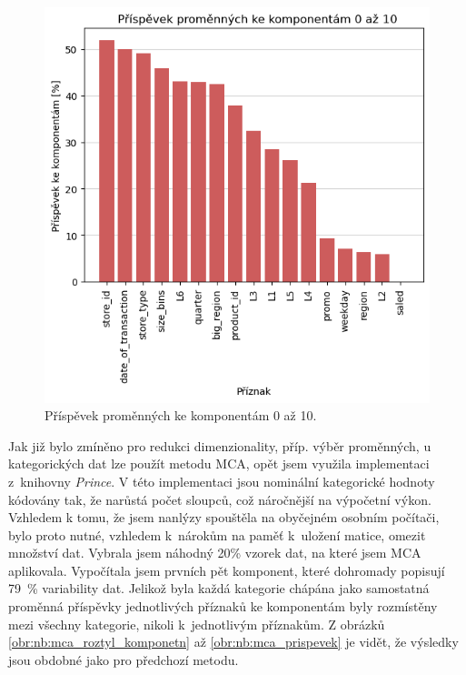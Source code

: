 \begin{figure}[h!]
    \centering
    \includegraphics[width=.6\textwidth]{obrazky/pripravadat/pca-prispevky.png}
    \caption{Příspěvek proměnných ke komponentám 0 až 10.}
    \label{obr:nb:pca_prispevek}
\end{figure}
    
Jak již bylo zmíněno pro redukci dimenzionality, příp. výběr proměnných, u kategorických dat lze použít metodu MCA, opět jsem využila implementaci z~knihovny \emph{Prince}. 
V této implementaci jsou nominální kategorické hodnoty kódovány tak, že narůstá počet sloupců, což náročnější na výpočetní výkon. Vzhledem k tomu, že jsem nanlýzy spouštěla na obyčejném osobním počítači, bylo proto nutné, vzhledem k~nárokům na paměť k~uložení matice, omezit množství dat. 
Vybrala jsem náhodný 20\% vzorek dat, na které jsem MCA aplikovala. Vypočítala jsem prvních pět komponent, které dohromady popisují 79~\% variability dat. Jelikož byla každá kategorie chápána jako samostatná proměnná příspěvky jednotlivých příznaků ke komponentám byly rozmístěny mezi všechny kategorie, nikoli k~jednotlivým příznakům. 
Z obrázků \ref*{obr:nb:mca_roztyl_komponetn} až \ref*{obr:nb:mca_prispevek} je vidět, že výsledky jsou obdobné jako pro předchozí metodu.

